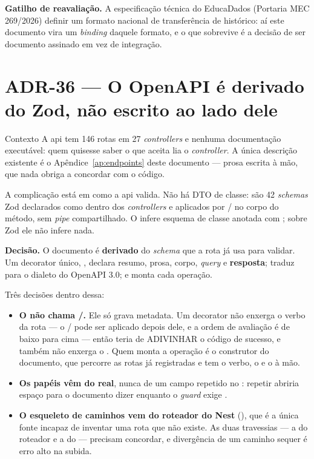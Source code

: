 \textbf{Gatilho de reavaliação.} A especificação técnica do EducaDados (Portaria
MEC 269/2026) definir um formato nacional de transferência de histórico: aí este
documento vira um \emph{binding} daquele formato, e o que sobrevive é a decisão
de ser documento assinado em vez de integração.

\section{ADR-36 --- O OpenAPI é derivado do Zod, não escrito ao lado dele}
\label{adr:openapi-derivado}

\begin{especificacao}{Contexto}
A api tem 146 rotas em 27 \emph{controllers} e nenhuma documentação executável:
quem quisesse saber o que  aceita lia o
\emph{controller}. A única descrição existente é o Apêndice~\ref{ap:endpoints}
deste documento --- prosa escrita à mão, que nada obriga a concordar com o
código.

A complicação está em como a api valida. Não há DTO de classe: são 42
\emph{schemas} Zod declarados como  dentro dos \emph{controllers} e
aplicados por / no corpo do método, sem
\emph{pipe} compartilhado. O  infere esquema de classe
anotada com ; sobre Zod ele não infere nada.
\end{especificacao}

\textbf{Decisão.} O documento é \textbf{derivado} do \emph{schema} que a rota já
usa para validar. Um decorator único, , declara resumo, prosa,
corpo, \emph{query} e \textbf{resposta};  traduz para o
dialeto do OpenAPI 3.0; e  monta cada operação.

Três decisões dentro dessa:

\begin{itemize}
  \item \textbf{O  não chama /.}
    Ele só grava metadata. Um decorator não enxerga o verbo da rota --- o
    / pode ser aplicado depois dele, e a ordem de avaliação é
    de baixo para cima --- então teria de ADIVINHAR o código de sucesso, e
    também não enxerga o . Quem monta a operação é o construtor do
    documento, que percorre as rotas já registradas e tem o verbo, o
     e o  à mão.
  \item \textbf{Os papéis vêm do  real}, nunca de um campo repetido no
    : repetir abriria espaço para o documento dizer
     enquanto o \emph{guard} exige .
  \item \textbf{O esqueleto de caminhos vem do roteador do Nest}
    (), que é a única fonte incapaz de inventar
    uma rota que não existe. As duas travessias --- a do roteador e a do
     --- precisam concordar, e divergência de um caminho
    sequer é erro alto na subida.
\end{itemize}

